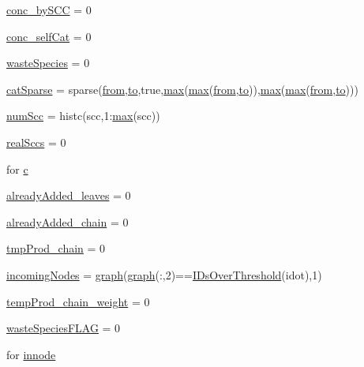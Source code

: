 \begin{DoxyCompactItemize}
\item 
\hyperlink{a00022_a5884b552ac8657e68e86a84f3d6c173a}{conc\-\_\-by\-S\-C\-C} = 0
\item 
\hyperlink{a00022_a2a45c56ac35d4906cc4a8363b98b1caa}{conc\-\_\-self\-Cat} = 0
\item 
\hyperlink{a00022_a4648745d0256487cb11cb5235f3b9be3}{waste\-Species} = 0
\item 
\hyperlink{a00022_af1693f05ef323ea183b39bc85226c0a8}{cat\-Sparse} = sparse(\hyperlink{a00022_aa7b4fe13e75a69fca72862effeaf6196}{from},\hyperlink{a00022_af71dbe52628a3f83a77ab494817525c6}{to},true,\hyperlink{a00056_a6d9c24e62aee61f54530163edf684ae2}{max}(\hyperlink{a00056_a6d9c24e62aee61f54530163edf684ae2}{max}(\hyperlink{a00022_aa7b4fe13e75a69fca72862effeaf6196}{from},\hyperlink{a00022_af71dbe52628a3f83a77ab494817525c6}{to})),\hyperlink{a00056_a6d9c24e62aee61f54530163edf684ae2}{max}(\hyperlink{a00056_a6d9c24e62aee61f54530163edf684ae2}{max}(\hyperlink{a00022_aa7b4fe13e75a69fca72862effeaf6196}{from},\hyperlink{a00022_af71dbe52628a3f83a77ab494817525c6}{to})))
\item 
\hyperlink{a00022_a0d0db21d4520f7561ff56e2c80e4fb69}{num\-Scc} = histc(scc,1\-:\hyperlink{a00056_a6d9c24e62aee61f54530163edf684ae2}{max}(scc))
\item 
\hyperlink{a00022_a135a83e607075aa815c72f1ec0cbbc5a}{real\-Sccs} = 0
\item 
for \hyperlink{a00022_a0f16b7d4c8c225e06e6a8b2081508e64}{c}
\item 
\hyperlink{a00022_aabbdc56dad7f3314f69a712de710352c}{already\-Added\-\_\-leaves} = 0
\item 
\hyperlink{a00022_a1ddec545d7ccb86836f79e7f7e9ecb55}{already\-Added\-\_\-chain} = 0
\item 
\hyperlink{a00022_a80829d80ab721e79924274808616e45a}{tmp\-Prod\-\_\-chain} = 0
\item 
\hyperlink{a00022_a34c98e3306059653f2a214e5ef975e9c}{incoming\-Nodes} = \hyperlink{a00022_a2745e24fec2a44d51f4452beb1596bd3}{graph}(\hyperlink{a00022_a2745e24fec2a44d51f4452beb1596bd3}{graph}(\-:,2)==\hyperlink{a00022_a67c695f856b6731644c6a128e602a323}{I\-Ds\-Over\-Threshold}(idot),1)
\item 
\hyperlink{a00022_ab9ed4e2836783080230592e6bd20ef86}{temp\-Prod\-\_\-chain\-\_\-weight} = 0
\item 
\hyperlink{a00022_a86a34d23ef767cc82038231f868cea96}{waste\-Species\-F\-L\-A\-G} = 0
\item 
for \hyperlink{a00022_a21f06040cb68a910280e04d4c59d980e}{innode}

\end{DoxyCompactItemize}

